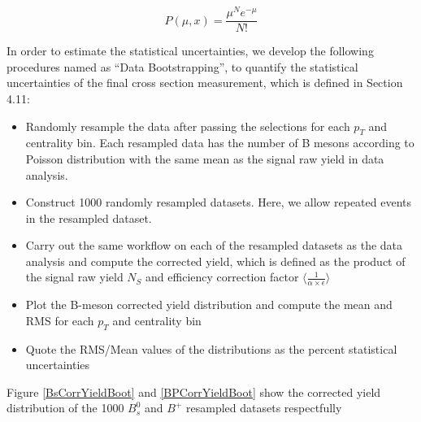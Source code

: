 \begin{equation}
P(\mu,x) = \frac{\mu^N e^{-\mu}}{N!}
\end{equation}

In order to estimate the statistical uncertainties, we develop the following procedures named as ``Data Bootstrapping'', to quantify the statistical uncertainties of the final cross section measurement, which is defined in Section 4.11:

\begin{itemize}
\item Randomly resample the data after passing the selections for each $p_T$ and centrality bin. Each resampled data has the number of B mesons according to Poisson distribution with the same mean as the signal raw yield in data analysis.
\item Construct 1000 randomly resampled datasets. Here, we allow repeated events in the resampled dataset.
\item Carry out the same workflow on each of the resampled datasets as the data analysis and compute the corrected yield, which is defined as the product of the signal raw yield $N_S$ and efficiency correction factor $\langle \frac{1}{\alpha \times \epsilon}\rangle$
\item Plot the B-meson corrected yield distribution and compute the mean and RMS for each $p_T$ and centrality bin
\item Quote the RMS/Mean values of the distributions as the percent statistical uncertainties
\end{itemize}

Figure \ref{BsCorrYieldBoot} and \ref{BPCorrYieldBoot} show the corrected yield distribution of the 1000 $B^0_s$ and $B^+$ resampled datasets respectfully




